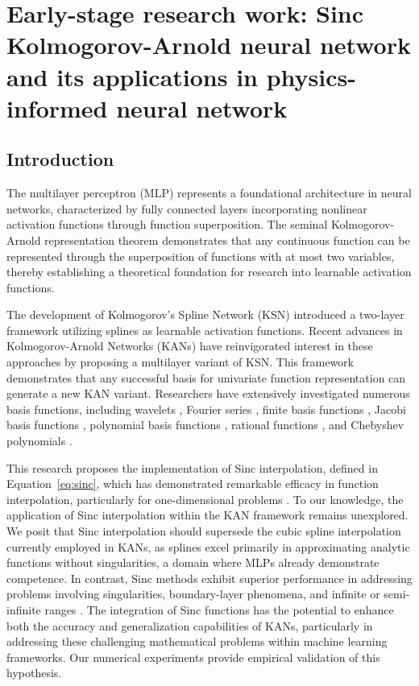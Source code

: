\chapter{Early-stage research work: Sinc Kolmogorov-Arnold neural network and its applications in physics-informed neural network}

\section{Introduction}\label{section:introduction}
The multilayer perceptron (MLP) represents a foundational architecture in neural networks, characterized by fully connected layers incorporating nonlinear activation functions through function superposition. The seminal Kolmogorov-Arnold representation theorem \citep{kolmogorov1961representation,arnol1959representation} demonstrates that any continuous function can be represented through the superposition of functions with at most two variables, thereby establishing a theoretical foundation for research into learnable activation functions.

The development of Kolmogorov's Spline Network (KSN) \citep{igelnik2003kolmogorov} introduced a two-layer framework utilizing splines as learnable activation functions. Recent advances in Kolmogorov-Arnold Networks (KANs) \citep{liu2024kan} have reinvigorated interest in these approaches by proposing a multilayer variant of KSN. This framework demonstrates that any successful basis for univariate function representation can generate a new KAN variant. Researchers have extensively investigated numerous basis functions, including wavelets \citep{bozorgasl2024wav,seydi2024unveiling}, Fourier series \citep{xu2024fourierkan}, finite basis functions \citep{howard2024finite}, Jacobi basis functions \citep{aghaei2024fkan}, polynomial basis functions \citep{seydi2024exploring}, rational functions \citep{aghaei2024rkan}, and Chebyshev polynomials \citep{ss2024chebyshev,shukla2024comprehensive}.

This research proposes the implementation of Sinc interpolation, defined in Equation~\ref{eq:sinc}, which has demonstrated remarkable efficacy in function interpolation, particularly for one-dimensional problems \citep{stenger2016handbook}. To our knowledge, the application of Sinc interpolation within the KAN framework remains unexplored. We posit that Sinc interpolation should supersede the cubic spline interpolation currently employed in KANs, as splines excel primarily in approximating analytic functions without singularities, a domain where MLPs already demonstrate competence. In contrast, Sinc methods exhibit superior performance in addressing problems involving singularities, boundary-layer phenomena, and infinite or semi-infinite ranges \citep{stenger2012numerical}. The integration of Sinc functions has the potential to enhance both the accuracy and generalization capabilities of KANs, particularly in addressing these challenging mathematical problems within machine learning frameworks. Our numerical experiments provide empirical validation of this hypothesis.


